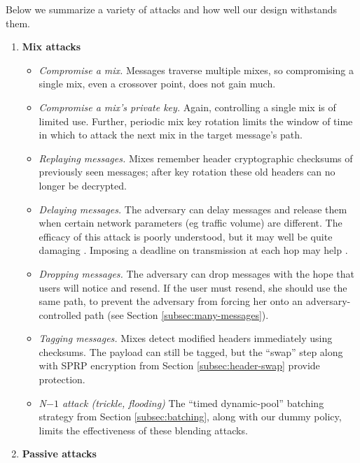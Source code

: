 \documentclass[times,10pt,twocolumn]{article}
\begin{document}

\label{sec:attacks}

Below we summarize a variety of attacks and how well our design withstands
them.

\begin{enumerate}
\item \textbf{Mix attacks}

\begin{itemize}
\item \emph{Compromise a mix.} Messages traverse multiple mixes, so
compromising a single mix, even a crossover point, does not gain much.
\item \emph{Compromise a mix's private key.} Again, controlling a single mix
is of limited use. Further, periodic mix key rotation limits the window
of time in which to attack the next mix in the target message's path.
\item \emph{Replaying messages.}  Mixes remember header cryptographic 
checksums of
previously seen messages; after key rotation these old headers can no
longer be decrypted.
\item \emph{Delaying messages.} The adversary can delay messages and
release them when certain network parameters (eg traffic volume) are
different. The efficacy of this attack is poorly understood, but it may
well be quite damaging \cite{trickle02}. Imposing a deadline on
transmission at each hop may help \cite{mix-acc}.
\item \emph{Dropping messages.} The adversary can drop messages with the
hope that users will notice and resend. If the user must resend, she
should use the same path, to prevent the adversary from forcing her onto
an adversary-controlled path (see Section \ref{subsec:many-messages}).
\item \emph{Tagging messages.} Mixes detect modified headers immediately
using checksums. The payload can still be tagged, but the ``swap'' step
along with SPRP encryption from Section \ref{subsec:header-swap}
provide protection.
\item \emph{N$-1$ attack (trickle, flooding)} The ``timed dynamic-pool''
batching strategy from Section \ref{subsec:batching}, along with our dummy
policy, limits the effectiveness of these blending attacks.
\end{itemize}

\item \textbf{Passive attacks}


\end{enumerate}
\end{document}

